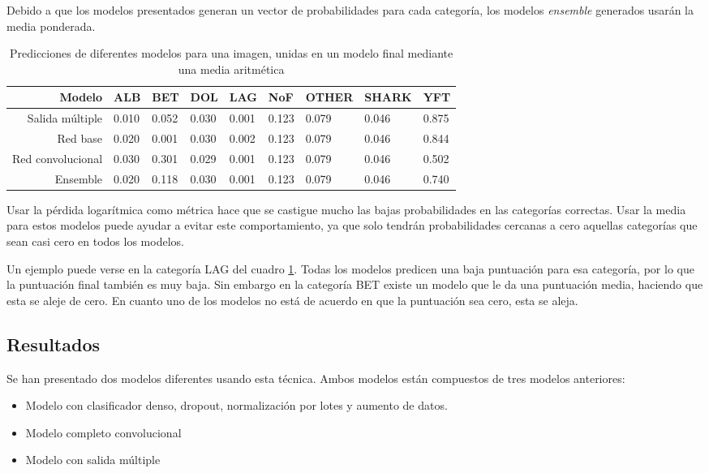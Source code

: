 Debido a que los modelos presentados generan un vector de probabilidades para
cada categoría, los modelos \textit{ensemble} generados usarán la media
ponderada.

\begin{table}[]
\centering
\caption{Predicciones de diferentes modelos para una imagen, unidas en un modelo
final mediante una media aritmética}
\label{ensemble_sample}
\begin{tabular}{rllllllll}
Modelo              & ALB   & BET   & DOL   & LAG   & NoF   & OTHER & SHARK  & YFT  \\
\hline
Salida múltiple     & 0.010 & 0.052 & 0.030 & 0.001 & 0.123 & 0.079 & 0.046 & 0.875\\
Red base            & 0.020 & 0.001 & 0.030 & 0.002 & 0.123 & 0.079 & 0.046 & 0.844\\
Red convolucional   & 0.030 & 0.301 & 0.029 & 0.001 & 0.123 & 0.079 & 0.046 & 0.502\\
\hline
Ensemble            & 0.020 & 0.118 & 0.030 & 0.001 & 0.123 & 0.079 & 0.046 & 0.740
\end{tabular}
\end{table}

Usar la pérdida logarítmica como métrica hace que se castigue mucho las bajas
probabilidades en las categorías correctas. Usar la media para estos modelos
puede ayudar a evitar este comportamiento, ya que solo tendrán probabilidades
cercanas a cero aquellas categorías que sean casi cero en todos los modelos.

Un ejemplo puede verse en la categoría LAG del cuadro \ref{ensemble_sample}.
Todas los modelos predicen una baja puntuación para esa categoría, por lo que la
puntuación final también es muy baja. Sin embargo en la categoría BET existe un
modelo que le da una puntuación media, haciendo que esta se aleje de cero. En
cuanto uno de los modelos no está de acuerdo en que la puntuación sea cero, esta
se aleja.

\subsection{Resultados}

Se han presentado dos modelos diferentes usando esta técnica. Ambos modelos
están compuestos de tres modelos anteriores:

\begin{itemize}
    \item{Modelo con clasificador denso, dropout, normalización por lotes y
        aumento de datos.}
    \item{Modelo completo convolucional}
    \item{Modelo con salida múltiple}
\end{itemize}

